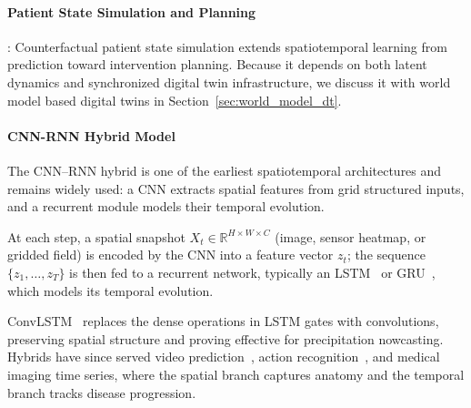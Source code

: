 \documentclass[journal]{IEEEtran}
\begin{document}

\paragraph{Patient State Simulation and Planning}: Counterfactual patient state simulation extends spatiotemporal learning from prediction toward intervention planning. Because it depends on both latent dynamics and synchronized digital twin infrastructure, we discuss it with world model based digital twins in Section~\ref{sec:world_model_dt}.

\paragraph{CNN-RNN Hybrid Model}
The CNN--RNN hybrid is one of the earliest spatiotemporal architectures and remains widely used: a CNN extracts spatial features from grid structured inputs, and a recurrent module models their temporal evolution.
 
At each step, a spatial snapshot $X_t \in \mathbb{R}^{H \times W \times C}$ (image, sensor heatmap, or gridded field) is encoded by the CNN into a feature vector $z_t$; the sequence $\{z_1,\ldots,z_T\}$ is then fed to a recurrent network, typically an LSTM~\cite{rnn_lstm} or GRU~\cite{cho2014gru}, which models its temporal evolution.
 
ConvLSTM~\cite{shi2015convolutional} replaces the dense operations in LSTM gates with convolutions, preserving spatial structure and proving effective for precipitation nowcasting. Hybrids have since served video prediction~\cite{srivastava2015unsupervised}, action recognition~\cite{donahue2015longterm}, and medical imaging time series, where the spatial branch captures anatomy and the temporal branch tracks disease progression.
 
\end{document}
